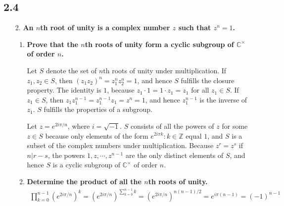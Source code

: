 \documentclass[a4paper,12pt]{article}
\begin{document}
\subsection*{2.4}
\begin{enumerate}
    \item[2.]
        \boldmath
        \textbf{An $n$th root of unity is a complex number $z$ such that $z^n = 1$.} \par
        \unboldmath
        \begin{enumerate}
            \item
                \boldmath
                \textbf{Prove that the $n$th roots of unity form a cyclic subgroup of $\mathbb{C}^\times$ of order $n$.} \par
                \unboldmath
                Let $S$ denote the set of $n$th roots of unity under multiplication. If $z_1, z_2 \in S$, then $(z_1 z_2)^n = z_1^n z_2^n = 1$, and hence $S$ fulfills the closure property. The identity is $1$, because $z_1 \cdot 1 = 1 \cdot z_1 = z_1$ for all $z_1 \in S$. If $z_1 \in S$, then $z_1 z_1^{n - 1} = z_1^{n - 1} z_1 = z^n = 1$, and hence $z_1^{n - 1}$ is the inverse of $z_1$. $S$ fulfills the properties of a subgroup. \par
                Let $z = e^{2i\pi / n}$, where $i = \sqrt{-1}$. $S$ consists of all the powers of $z$ for some $z \in S$ because only elements of the form $e^{2i\pi k} : k \in \mathbb{Z}$ equal $1$, and $S$ is a subset of the complex numbers under multiplication. Because $z^r = z^s$ if $n | r - s$, the powers $1, z, \cdots, z^{n - 1}$ are the only distinct elements of $S$, and hence $S$ is a cyclic subgroup of $\mathbb{C}^\times$ of order $n$.

            \item
                \boldmath
                \textbf{Determine the product of all the $n$th roots of unity.}
                \unboldmath
                \begin{align*}
                    \prod_{k = 0}^{n - 1} \left( e^{2i\pi / n} \right)^k = \left( e^{2i\pi / n} \right)^{\sum_{k = 0}^{n - 1} k} = \left( e^{2i\pi / n} \right)^{n(n - 1)/2} = e^{i\pi(n - 1)} = (-1)^{n - 1}
                \end{align*}
        \end{enumerate}


\end{enumerate}
\end{document}
